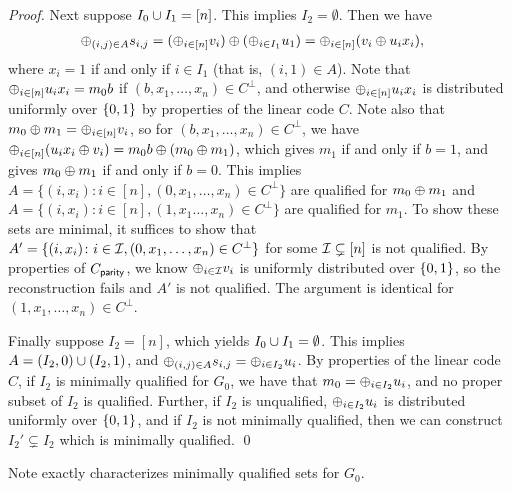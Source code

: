 \begin{proof}
	Next suppose $I_0 \cup I_1 = [n]$. 
	This implies $I_2 = \emptyset$.
	Then we have
	\begin{align*}
		\oplus_{(i,j)\in A} s_{i,j} &= (\oplus_{i \in [n]} v_i) \oplus (\oplus_{i \in I_1} u_1) = \oplus_{i \in [n]} (v_i \oplus u_ix_i),
	\end{align*}
	where $x_i = 1$ if and only if $i \in I_1$ (that is, $(i,1) \in A$).
	Note that $\oplus_{i \in [n]} u_i x_i = m_0b$ if $(b, x_1,\dotsc, x_n) \in C^\perp$, and otherwise $\oplus_{i\in [n]} u_ix_i$ is distributed uniformly over ${\{0,1\}}$ by properties of the linear code $C$.
	Note also that $m_0\oplus m_1 = \oplus_{i \in [n]} v_i$, so for $(b, x_1,\dotsc, x_n) \in C^\perp$, we have $\oplus_{i \in [n]} (u_ix_i \oplus v_i) = m_0b \oplus (m_0\oplus m_1)$, which gives $m_1$ if and only if $b = 1$, and gives $m_0\oplus m_1$ if and only if $b = 0$.
	This implies $A = \{ (i, x_i)\colon i \in [n], (0,x_1,\dotsc, x_n) \in C^\perp \}$
	are qualified for $m_0\oplus m_1$ and $A = \{ (i,x_i) \colon i\in[n], (1,x_1\dotsc,x_n) \in C^\perp \}$ are qualified for $m_1$.
	To show these sets are minimal, it suffices to show that $A' = \{ (i, x_i) \colon i \in {\mathcal I},  (0,x_1,\dotsc, x_n) \in C^\perp\}$ for some ${\mathcal I} \subsetneq [n]$ is not qualified.
	By properties of $C_\mathsf{parity}$, we know $\oplus_{i \in {\mathcal I}} v_i$ is uniformly distributed over ${\{0,1\}}$, so the reconstruction fails and $A'$ is not qualified.
	The argument is identical for $(1,x_1,\dotsc, x_n) \in C^\perp$.
	
	Finally suppose $I_2 = [n]$, which yields $I_0 \cup I_1 = \emptyset$.
	This implies $A = (I_2, 0) \cup (I_2, 1)$, and $\oplus_{(i,j)\in A}s_{i,j} = \oplus_{i \in I_2} u_i$.
	By properties of the linear code $C$, if $I_2$ is minimally qualified for $G_0$, we have that $m_0 = \oplus_{i \in I_2} u_i$, and no proper subset of $I_2$ is qualified.
	Further, if $I_2$ is unqualified, $\oplus_{i \in I_2} u_i$ is distributed uniformly over ${\{0,1\}}$, and if $I_2$ is not minimally qualified, then we can construct $I_2' \subsetneq I_2$ which is minimally qualified. \qed
\end{proof}
Note  exactly characterizes minimally qualified sets for $G_0$.
















